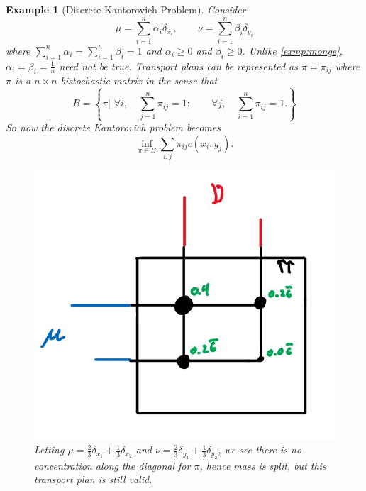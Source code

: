 \documentclass[12pt]{article}
\theoremstyle{plain}
\newtheorem{exmp}{Example}[section]
\numberwithin{equation}{section}
\begin{document}
\begin{exmp}[Discrete Kantorovich Problem] Consider 
  \[\mu = \sum_{i=1}^n\alpha_i\delta_{x_i},\qquad\nu = \sum_{i=1}^n\beta_{i}\delta_{y_i}\] where $\sum_{i=1}^n \alpha_i = \sum_{i=1}^n\beta_i = 1$ and $\alpha_i \ge 0$ and $\beta_i \ge 0$. Unlike \autoref{exmp:monge}, $\alpha_i = \beta_i = \frac{1}{n}$ need not be true. Transport plans can be represented as $\pi = \pi_{ij}$\cite{thorpe} where $\pi$ is a $n\times n$ bistochastic matrix in the sense that
  \[B = \left\{\pi \bigg\vert\,\,\forall i, \quad \sum_{j=1}^n\pi_{ij} = 1;\qquad\forall j,\quad \sum_{i=1}^n\pi_{ij} = 1.\right\}\]
  So now the discrete Kantorovich problem becomes 
  \begin{equation}
    \inf_{\pi\in B}\sum_{i,j}\pi_{ij}c(x_i,y_j).
  \end{equation}
  \begin{figure}[H]
    \center
    \includegraphics[scale=0.3]{discretekant.jpg}
    \caption{Letting $\mu = \frac{2}{3}\delta_{x_1} + \frac{1}{3}\delta_{x_2}$ and $\nu = \frac{2}{3}\delta_{y_1} + \frac{1}{3}\delta_{y_2}$, we see there is no concentration along the diagonal for $\pi$, hence mass is split, but this transport plan is still valid.}
    \label{fig:kant}
  \end{figure}
\end{exmp}
\newpage 
\end{document}
